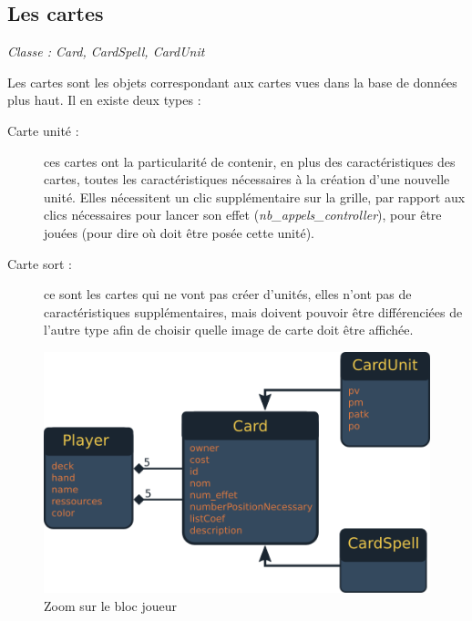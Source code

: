 \documentclass[a4paper,11pt]{report}
\begin{document}
        \subsection{Les cartes}
          \begin{center}
           \textit{Classe : Card, CardSpell, CardUnit}
          \end{center}
          Les cartes sont les objets correspondant aux cartes vues dans la base de données plus haut. Il en existe deux types :
          \begin{description}
            \item[Carte unité :] ces cartes ont la particularité de contenir, en plus des caractéristiques des cartes, toutes les caractéristiques nécessaires à la création d'une nouvelle unité. Elles nécessitent un clic supplémentaire sur la grille, par rapport aux clics nécessaires pour lancer son effet (\textit{nb\_appels\_controller}), pour être jouées (pour dire où doit être posée cette unité).
            \item[Carte sort :]  ce sont les cartes qui ne vont pas créer d'unités, elles n'ont pas de caractéristiques supplémentaires, mais doivent pouvoir être différenciées de l'autre type afin de choisir quelle image de carte doit être affichée.
          \end{description}
         
         \begin{figure}[th]
          \begin{center}
            \includegraphics[scale=0.4]{Assets/umlBlocCarte.png}
            \caption{Zoom sur le bloc joueur}
            \label{fig7}
          \end{center}
        \end{figure}
             
\end{document}
